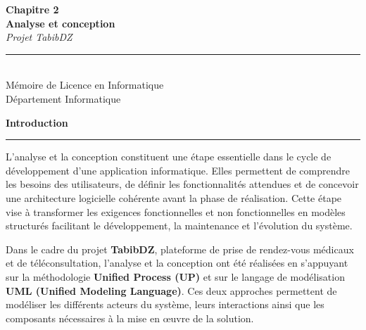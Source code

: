 \documentclass[12pt,a4paper]{report}
\begin{document}

\newpage
\thispagestyle{empty}
\vspace*{\fill}

\begin{center}
  {\Huge\bfseries Chapitre 2}\\[0.8cm]
  {\huge\bfseries Analyse et conception}\\[1.2cm]
  {\large\itshape Projet TabibDZ}\\[2cm]
  \rule{0.5\textwidth}{0.4pt}\\[1.2cm]
  {\normalsize M\'emoire de Licence en Informatique}\\[0.3cm]
  {\small D\'epartement Informatique}
\end{center}

\vspace*{\fill}
\newpage

\thispagestyle{empty}
\vspace*{\fill}

\begin{center}
{\Huge\bfseries\color{primaryblue} Introduction}

\vspace{0.3cm}

{\color{primaryblue}\rule{0.5\textwidth}{1.2pt}}
\end{center}

\vspace{0.8cm}


L'analyse et la conception constituent une \'etape essentielle dans le cycle de d\'eveloppement d'une application informatique. Elles permettent de comprendre les besoins des utilisateurs, de d\'efinir les fonctionnalit\'es attendues et de concevoir une architecture logicielle coh\'erente avant la phase de r\'ealisation. Cette \'etape vise \`a transformer les exigences fonctionnelles et non fonctionnelles en mod\`eles structur\'es facilitant le d\'eveloppement, la maintenance et l'\'evolution du syst\`eme.

Dans le cadre du projet \textbf{TabibDZ}, plateforme de prise de rendez-vous m\'edicaux et de t\'el\'econsultation, l'analyse et la conception ont \'et\'e r\'ealis\'ees en s'appuyant sur la m\'ethodologie \textbf{Unified Process (UP)} et sur le langage de mod\'elisation \textbf{UML (Unified Modeling Language)}. Ces deux approches permettent de mod\'eliser les diff\'erents acteurs du syst\`eme, leurs interactions ainsi que les composants n\'ecessaires \`a la mise en \oe{}uvre de la solution.
\end{document}
